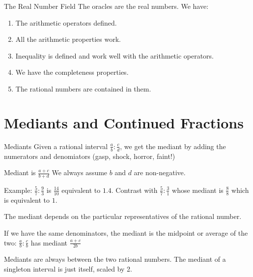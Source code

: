 \documentclass{beamer}
\begin{document}
\begin{frame}{The Real Number Field}
    The oracles are the real numbers. We have:

    \begin{enumerate}
        \item The arithmetic operators defined.
        \item All the arithmetic properties work.
        \item Inequality is defined and work well with the arithmetic operators.
        \item We have the completeness properties. 
        \item The rational numbers are contained in them. 
    \end{enumerate}
    
\end{frame}

\section{Mediants and Continued Fractions}

\begin{frame}{Mediants}
    Given a rational interval $\frac{a}{b} : \frac{c}{d}$, we get the mediant by adding the numerators and denomiators (gasp, shock, horror, faint!)

    Mediant is $\frac{a+c}{b+d}$  We always assume $b$ and $d$ are non-negative. 

    Example:  $\frac{5}{7}:\frac{9}{3}$ is $\frac{14}{10}$ equivalent to $1.4$. Contrast with $\frac{5}{7}:\frac{3}{1}$ whose mediant is $\frac{8}{8}$ which is equivalent to $1$.

    The mediant depends on the particular representatives of the rational number. 

    If we have the same denominators, the mediant is the midpoint or average of the two: $\frac{a}{b}:\frac{c}{b}$ has mediant $\frac{a+c}{2b}$

    Mediants are always between the two rational numbers. The mediant of a singleton interval is just itself, scaled by 2.  
    
\end{frame}
\end{document}
